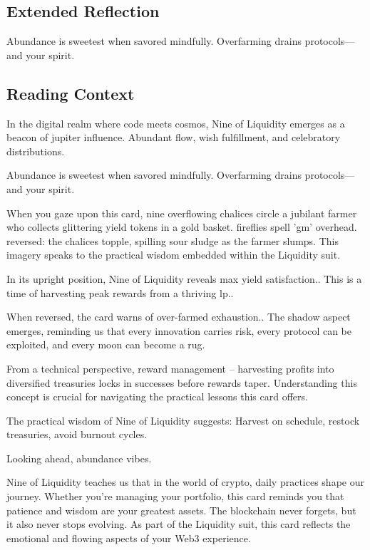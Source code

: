 \documentclass[11pt,oneside]{book}
\begin{document}
\begin{minipage}[t]{0.55\textwidth}
  \subsection*{Extended Reflection}
  Abundance is sweetest when savored mindfully. Overfarming drains protocols—and your spirit.

  \subsection*{Reading Context}
  In the digital realm where code meets cosmos, Nine of Liquidity emerges as a beacon of jupiter influence. Abundant flow, wish fulfillment, and celebratory distributions.

  Abundance is sweetest when savored mindfully. Overfarming drains protocols—and your spirit.

  When you gaze upon this card, nine overflowing chalices circle a jubilant farmer who collects glittering yield tokens in a gold basket. fireflies spell 'gm' overhead. reversed: the chalices topple, spilling sour sludge as the farmer slumps. This imagery speaks to the practical wisdom embedded within the Liquidity suit.

  In its upright position, Nine of Liquidity reveals max yield satisfaction.. This is a time of harvesting peak rewards from a thriving lp..

  When reversed, the card warns of over-farmed exhaustion.. The shadow aspect emerges, reminding us that every innovation carries risk, every protocol can be exploited, and every moon can become a rug.

  From a technical perspective, reward management – harvesting profits into diversified treasuries locks in successes before rewards taper. Understanding this concept is crucial for navigating the practical lessons this card offers.

  The practical wisdom of Nine of Liquidity suggests: Harvest on schedule, restock treasuries, avoid burnout cycles.

  Looking ahead, abundance vibes.

  Nine of Liquidity teaches us that in the world of crypto, daily practices shape our journey. Whether you're managing your portfolio, this card reminds you that patience and wisdom are your greatest assets. The blockchain never forgets, but it also never stops evolving. As part of the Liquidity suit, this card reflects the emotional and flowing aspects of your Web3 experience.

\end{minipage}
\end{document}
